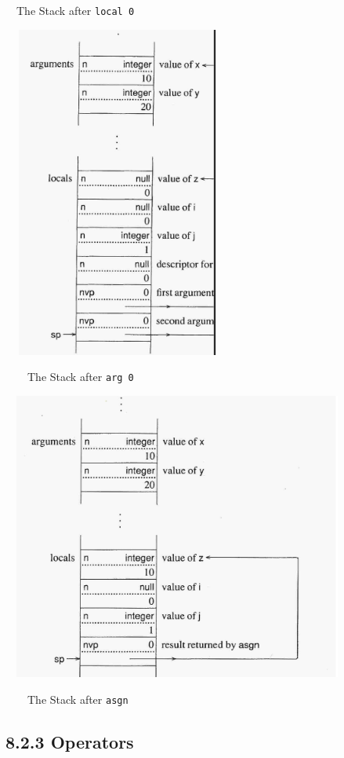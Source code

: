 \ \ The Stack after \texttt{local 0}


\bigskip


\bigskip


\bigskip


\bigskip


\ \  \includegraphics[width=2.6717in,height=4.3118in]{ib-img/ib-img053.jpg} 


\ \ \ \ The Stack after \texttt{arg 0}


\ \  \includegraphics[width=4.2752in,height=3.7335in]{ib-img/ib-img054.jpg} 


\ \ \ \ The Stack after \texttt{asgn}


\subsection[8.2.3 Operators]{8.2.3 \textbf{Operators}}

